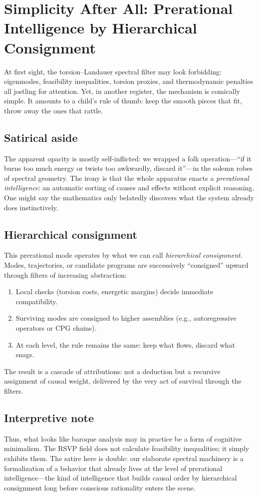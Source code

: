 \documentclass[a4paper,11pt]{article}
\begin{document}
\section{Simplicity After All: Prerational Intelligence by Hierarchical Consignment}
\label{sec:prerational}

At first sight, the torsion--Landauer spectral filter may look forbidding:
eigenmodes, feasibility inequalities, torsion proxies, and thermodynamic
penalties all jostling for attention. Yet, in another register, the mechanism
is comically simple. It amounts to a child's rule of thumb: keep the smooth
pieces that fit, throw away the ones that rattle.

\subsection{Satirical aside}
The apparent opacity is mostly self-inflicted: we wrapped a folk
operation---``if it burns too much energy or twists too awkwardly, discard
it''---in the solemn robes of spectral geometry. The irony is that the whole
apparatus enacts a \emph{prerational intelligence}: an automatic sorting of
causes and effects without explicit reasoning. One might say the mathematics
only belatedly discovers what the system already does instinctively.

\subsection{Hierarchical consignment}
This prerational mode operates by what we can call \emph{hierarchical
consignment}. Modes, trajectories, or candidate programs are successively
``consigned'' upward through filters of increasing abstraction:
\begin{enumerate}
\item Local checks (torsion costs, energetic margins) decide immediate
compatibility.
\item Surviving modes are consigned to higher assemblies (e.g., autoregressive
operators or CPG chains).
\item At each level, the rule remains the same: keep what flows, discard what
snags.
\end{enumerate}
The result is a cascade of attributions: not a deduction but a recursive
assignment of causal weight, delivered by the very act of survival through the
filters.

\subsection{Interpretive note}
Thus, what looks like baroque analysis may in practice be a form of cognitive
minimalism. The RSVP field does not calculate feasibility inequalities; it
simply exhibits them. The satire here is double: our elaborate spectral
machinery is a formalization of a behavior that already lives at the level of
prerational intelligence---the kind of intelligence that builds causal order
by hierarchical consignment long before conscious rationality enters the
scene.
\end{document}
